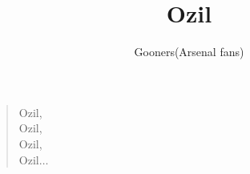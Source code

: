 \documentclass[a4paper,12pt]{article}
\title{Ozil}
\author{Gooners(Arsenal fans)}
\date{}
\begin{document}
	
	\maketitle
	
	\begin{verse}
		
		Ozil, \\
		Ozil, \\
		Ozil, \\
		Ozil$\ldots$
		
	\end{verse}
	
\end{document}
